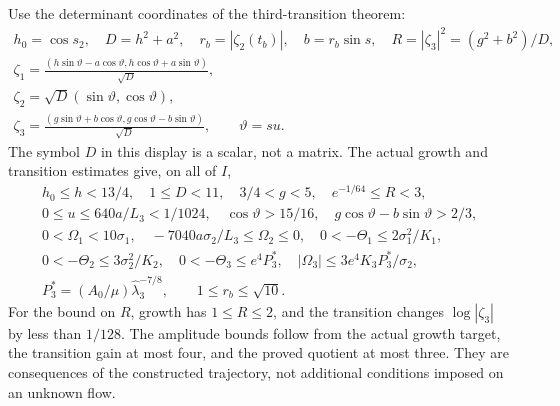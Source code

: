 Use the determinant coordinates of the third-transition theorem:
\begin{equation}\label{cvlane:tts:geometry}
 \begin{gathered}
 h_0=\cos s_2,\quad D=h^2+a^2,\quad
 r_b=|\zeta_2(t_b)|,\quad b=r_b\sin s,\quad
 R=|\zeta_3|^2=(g^2+b^2)/D,\\
 \zeta_1=\frac{(h\sin\vartheta-a\cos\vartheta,
                     h\cos\vartheta+a\sin\vartheta)}{\sqrt D},\\
 \zeta_2=\sqrt D(\sin\vartheta,\cos\vartheta),\\
 \zeta_3=\frac{(g\sin\vartheta+b\cos\vartheta,
                     g\cos\vartheta-b\sin\vartheta)}{\sqrt D},
 \qquad\vartheta=su.
 \end{gathered}
\end{equation}
The symbol $D$ in this display is a scalar, not a matrix.
The actual growth and transition estimates give, on all of $I$,
\begin{equation}\label{cvlane:tts:box}
 \begin{gathered}
 h_0\leq h<13/4,\quad 1\leq D<11,\quad 3/4<g<5,
 \quad e^{-1/64}\leq R<3,\\
 0\leq u\leq640a/L_3<1/1024,\quad
 \cos\vartheta>15/16,\quad
 g\cos\vartheta-b\sin\vartheta>2/3,\\
 0<\Omega_1<10\sigma_1,\quad
 -7040a\sigma_2/L_3\leq\Omega_2\leq0,\quad
 0<-\Theta_1\leq2\sigma_1^2/K_1,\\
 0<-\Theta_2\leq3\sigma_2^2/K_2,\quad
 0<-\Theta_3\leq e^4P_3^*,\quad
 |\Omega_3|\leq3e^4K_3P_3^*/\sigma_2,\\
 P_3^*=(A_0/\mu)\widehat\lambda_3^{-7/8},\qquad
 1\leq r_b\leq\sqrt{10}.
 \end{gathered}
\end{equation}
For the bound on $R$, growth has $1\leq R\leq2$, and the
transition changes $\log|\zeta_3|$ by less than $1/128$.
The amplitude bounds follow from the actual growth target, the
transition gain at most four, and the proved quotient at most three.
They are consequences of the constructed trajectory, not additional
conditions imposed on an unknown flow.


